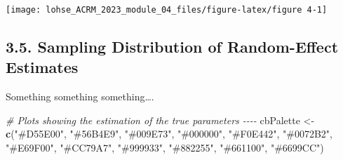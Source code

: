 \documentclass[
]{article}
\newenvironment{Shaded}{\begin{snugshade}}{\end{snugshade}}
\newcommand{\CommentTok}[1]{\textcolor[rgb]{0.56,0.35,0.01}{\textit{#1}}}
\newcommand{\FunctionTok}[1]{\textcolor[rgb]{0.13,0.29,0.53}{\textbf{#1}}}
\newcommand{\NormalTok}[1]{#1}
\newcommand{\OtherTok}[1]{\textcolor[rgb]{0.56,0.35,0.01}{#1}}
\newcommand{\StringTok}[1]{\textcolor[rgb]{0.31,0.60,0.02}{#1}}
\begin{document}
\begin{center}\texttt{[image: lohse\_ACRM\_2023\_module\_04\_files/figure-latex/figure 4-1]} \end{center}

\hypertarget{sampling-distribution-of-random-effect-estimates}{%
\subsection{3.5. Sampling Distribution of Random-Effect
Estimates}\label{sampling-distribution-of-random-effect-estimates}}

Something something something\ldots.

\begin{Shaded}
\begin{Highlighting}[]
\CommentTok{\# Plots showing the estimation of the true parameters {-}{-}{-}{-}}
\NormalTok{cbPalette }\OtherTok{\textless{}{-}} \FunctionTok{c}\NormalTok{(}\StringTok{"\#D55E00"}\NormalTok{, }\StringTok{"\#56B4E9"}\NormalTok{, }\StringTok{"\#009E73"}\NormalTok{, }\StringTok{"\#000000"}\NormalTok{, }
               \StringTok{"\#F0E442"}\NormalTok{, }\StringTok{"\#0072B2"}\NormalTok{, }\StringTok{"\#E69F00"}\NormalTok{, }\StringTok{"\#CC79A7"}\NormalTok{,}
               \StringTok{"\#999933"}\NormalTok{, }\StringTok{"\#882255"}\NormalTok{, }\StringTok{"\#661100"}\NormalTok{, }\StringTok{"\#6699CC"}\NormalTok{)}



\end{Highlighting}
\end{Shaded}
\end{document}

